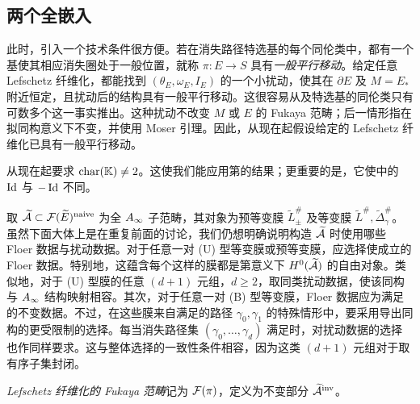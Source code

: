 \subsection{两个全嵌入}\label{sec:18f}
此时，引入一个技术条件很方便。若在消失路径特选基的每个同伦类中，都有一个基使其相应消失圈处于一般位置，就称 $\pi:E\to S$ 具有\emph{一般平行移动}。给定任意 Lefschetz 纤维化，都能找到 $(\theta_E,\omega_E,I_E)$ 的一个小扰动，使其在 $\partial E$ 及 $M=E_*$ 附近恒定，且扰动后的结构具有一般平行移动。这很容易从及特选基的同伦类只有可数多个这一事实推出。这种扰动不改变 $M$ 或 $E$ 的 Fukaya 范畴；后一情形指在拟同构意义下不变，并使用 Moser 引理。因此，从现在起假设给定的 Lefschetz 纤维化已具有一般平行移动。

从现在起要求 $\operatorname{char}(\mathbb K)\ne2$。这使我们能应用第的结果；更重要的是，它使中的 $\operatorname{Id}$ 与 $-\operatorname{Id}$ 不同。

取 $\widetilde{\mathcal A}\subset\mathcal F(\widetilde E)^{\mathrm{naive}}$ 为全 $A_\infty$ 子范畴，其对象为预等变膜 $\widetilde L_\pm^\#$ 及等变膜 $\widetilde L^\#,\widetilde\Delta_\gamma^\#$。虽然下面大体上是在重复前面的讨论，我们仍想明确说明构造 $\widetilde{\mathcal A}$ 时使用哪些 Floer 数据与扰动数据。对于任意一对 (U) 型等变膜或预等变膜，应选择使成立的 Floer 数据。特别地，这蕴含每个这样的膜都是第意义下 $H^0(\widetilde{\mathcal A})$ 的自由对象。类似地，对于 (U) 型膜的任意 $(d+1)$ 元组，$d\ge2$，取同类扰动数据，使该同构与 $A_\infty$ 结构映射相容。其次，对于任意一对 (B) 型等变膜，Floer 数据应为满足的不变数据。不过，在这些膜来自满足的路径 $\gamma_0,\gamma_1$ 的特殊情形中，要采用导出同构的更受限制的选择。每当消失路径集 $(\gamma_0,\ldots,\gamma_d)$ 满足时，对扰动数据的选择也作同样要求。这与整体选择的一致性条件相容，因为这类 $(d+1)$ 元组对于取有序子集封闭。

\begin{definition}\label{st:18.12}
\emph{Lefschetz 纤维化的 Fukaya 范畴}记为 $\mathcal F(\pi)$，定义为不变部分 $\widetilde{\mathcal A}^{\mathrm{inv}}$。
\end{definition}

